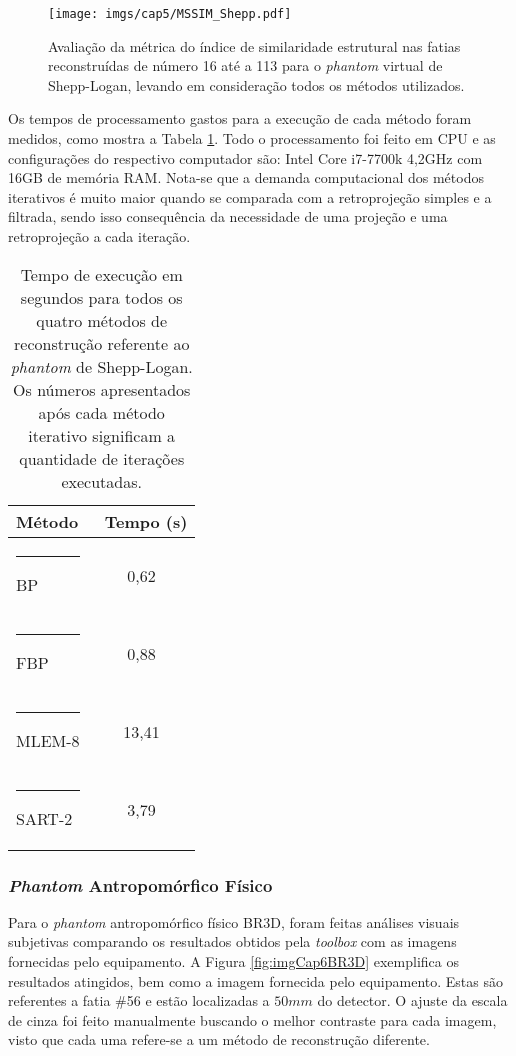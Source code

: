 \begin{figure}[!h]
	\caption{Avaliação da métrica do índice de similaridade estrutural nas fatias reconstruídas de número 16 até a 113 para o \textit{phantom} virtual de Shepp-Logan, levando em consideração todos os métodos utilizados.}
	\begin{center}
		\texttt{[image: imgs/cap5/MSSIM\_Shepp.pdf]}
	\end{center}
	\label{fig:imgCap6MSSIM}
\end{figure}

Os tempos de processamento gastos para a execução de cada método foram medidos, como mostra a Tabela \ref{tab:tabCap6TimeSheppLogan}. Todo o processamento foi feito em \acs{CPU} e as configurações do respectivo computador são: Intel Core i7-7700k 4,2GHz com 16GB de memória RAM. Nota-se que a demanda computacional dos métodos iterativos é muito maior quando se comparada com a retroprojeção simples e a filtrada, sendo isso consequência da necessidade de uma projeção e uma retroprojeção a cada iteração. 

\begin{table}[!ht]
	\centering
	\caption{Tempo de execução em segundos para todos os quatro métodos de reconstrução referente ao \textit{phantom} de Shepp-Logan. Os números apresentados após cada método iterativo significam a quantidade de iterações executadas.}
	\label{tab:tabCap6TimeSheppLogan}
	\begin{tabular}{l|c}
		\textbf{Método}	     & \ \textbf{Tempo (s)} \\ 
		\hline
		\hline
		\rule[-0.5ex]{-3pt}{3ex}
		BP 	 		& 0,62 									\\ 
		\hline
		\rule[-0.5ex]{-3pt}{3ex}
		FBP			& 0,88 									\\
		\hline
		\rule[-0.5ex]{-3pt}{3ex}
		MLEM-8		& 13,41 								\\
		\hline
		\rule[-0.5ex]{-3pt}{3ex}
		SART-2		& 3,79								\\
		\hline
	\end{tabular}
	\vspace{2ex}
\end{table}

\subsubsection{\textit{Phantom} Antropomórfico Físico}

Para o \textit{phantom} antropomórfico físico BR3D, foram feitas análises visuais subjetivas comparando os resultados obtidos pela \textit{toolbox} com as imagens fornecidas pelo equipamento. A Figura \ref{fig:imgCap6BR3D} exemplifica os resultados atingidos, bem como a imagem fornecida pelo equipamento. Estas são referentes a fatia \#56 e estão localizadas a $50mm$ do detector. O ajuste da escala de cinza foi feito manualmente buscando o melhor contraste para cada imagem, visto que cada uma refere-se a um método de reconstrução diferente.

